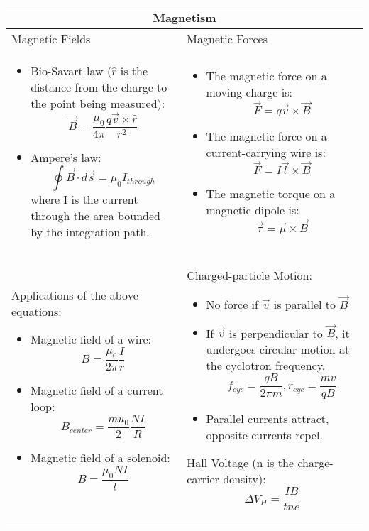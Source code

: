 \documentclass{article}
\begin{document}
\begin{center}
	\begin{tabular}{|p{8cm}|p{8cm}|}
		\hline
		\multicolumn{2}{|c|}{Magnetism}                                                     \\
		\hline

		Magnetic Fields & Magnetic Forces                                                   \\

		\begin{itemize}
			\item Bio-Savart law ($ \hat{r}$ is the distance from the charge to the point being measured):
			      \[ \vec{B} = \frac{\mu_0}{4\pi} \frac{q\vec{v} \times \hat{r}}{r^2} \]
			\item Ampere's law:
			      \[ \oint \vec{B} \cdot d \vec{s} = \mu_0 I_{through} \]
			      where I is the current through the area bounded by the integration path.

		\end{itemize}

		                &

		\begin{itemize}
			\item The magnetic force on a moving charge is:
			      \[ \vec{F} = q\vec{v} \times \vec{B} \]
			\item The magnetic force on a current-carrying wire is:
			      \[ \vec{F} = I\vec{l} \times \vec{B} \]
			\item The magnetic torque on a magnetic dipole is:
			      \[ \vec{\tau} = \vec{\mu} \times \vec{B}\]
		\end{itemize} \\
		\hline

		Applications of the above equations:
		\begin{itemize}
			\item Magnetic field of a wire:
			      \[B = \frac{\mu_0}{2\pi} \frac{I}{r}\]
			\item Magnetic field of a current loop:
			      \[B_{center} = \frac{mu_0}{2}\frac{NI}{R}\]
			\item Magnetic field of a solenoid:
			      \[B = \frac{\mu_0NI}{l}\]
		\end{itemize}

		                &

		Charged-particle Motion:
		\begin{itemize}
			\item No force if $\vec{v}$ is parallel to $\vec{B}$
			\item If $\vec{v}$ is perpendicular to $\vec{B}$, it undergoes circular motion at the cyclotron frequency.
			      \[ f_{cyc} = \frac{qB}{2\pi m}, r_{cyc} = \frac{mv}{qB}\]
			\item Parallel currents attract, opposite currents repel.
		\end{itemize}

		Hall Voltage (n is the charge-carrier density):
		\[ \Delta V_H = \frac{IB}{tne}\]                                                    \\
		\hline
	\end{tabular}
\end{center}
\end{document}
